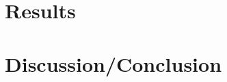 \documentclass[nofootinbib,aps,prd,preprint,superscriptaddress]{revtex4}
\begin{document}
	\section{Results}
	\section{Discussion/Conclusion}	
	
	
%		
		
\end{document}
